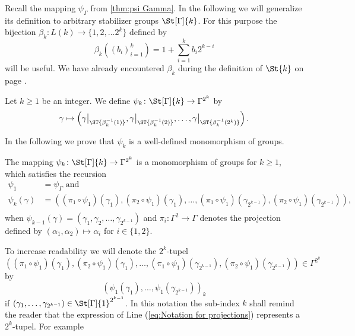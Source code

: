 Recall the mapping $\psi_\Gamma$ from \cref{thm:psi Gamma}. In the following we will generalize its definition to arbitrary stabilizer groups $\St[\Gamma]{k}$. For this purpose the bijection $\beta_k\colon L(k)\to\lbrace 1,2,\ldots 2^k\rbrace$ defined by
\begin{equation*}
\beta_k\left((b_i)_{i=1}^k\right)=1+\sum_{i=1}^{k} b_{i}2^{k-i}
\end{equation*}
will be useful. We have already encountered $\beta_k$ during the definition of $\St{k}$ on page \pageref{def:Stabilizer Group}.
\begin{defin}
Let $k\geq 1$ be an integer. We define $\psi_k\colon\St[\Gamma]{k}\to\Gamma^{2^k}$ by
\begin{equation*}
\gamma\mapsto\left(\gamma\big\vert_{\ST{\beta_k^{-1}(1)}},\gamma\big\vert_{\ST{\beta_k^{-1}(2)}},\ldots,\gamma\big\vert_{\ST{\beta_k^{-1}(2^k)}}\right).
\end{equation*}
\end{defin}
In the following we prove that $\psi_k$ is a well-defined monomorphism of groups.
\begin{thm}\label{thm:psi k}
The mapping $\psi_k\colon\St[\Gamma]{k}\to\Gamma^{2^k}$ is a monomorphism of groups for $k\geq1$, which satisfies the recursion
\begin{align}
\psi_1&=\psi_\Gamma\text{ and}\label{eq:psi1=psiGamma}\\
\psi_k(\gamma)&=\left((\pi_1\circ\psi_1)(\gamma_1),(\pi_2\circ\psi_1)(\gamma_1),\ldots,(\pi_1\circ\psi_1)(\gamma_{2^{k-1}}),(\pi_2\circ\psi_1)(\gamma_{2^{k-1}})\right),\nonumber\\
\end{align}
when $\psi_{k-1}(\gamma)=(\gamma_1,\gamma_2,\ldots,\gamma_{2^{k-1}})$ and $\pi_i\colon\Gamma^2\to\Gamma$ denotes the projection defined by $(\alpha_1,\alpha_2)\mapsto\alpha_i$ for $i\in\lbrace 1,2\rbrace$.
\end{thm}
To increase readability we will denote the $2^k$-tupel
\begin{equation*}
\left((\pi_1\circ\psi_1)(\gamma_1),(\pi_2\circ\psi_1)(\gamma_1),\ldots,(\pi_1\circ\psi_1)(\gamma_{2^{k-1}}),(\pi_2\circ\psi_1)(\gamma_{2^{k-1}})\right)\in\Gamma^{2^k}
\end{equation*}
by 
\begin{equation}\label{eq:Notation for projections}
\left(\psi_1(\gamma_1),\ldots,\psi_1(\gamma_{2^{k-1}})\right)_k
\end{equation}
if $(\gamma_1,\ldots,\gamma_{2^{k-1}})\in\St[\Gamma]{1}^{2^{k-1}}$. In this notation the sub-index $k$ shall remind the reader that the expression of Line (\ref{eq:Notation for projections}) represents a $2^k$-tupel. For example
